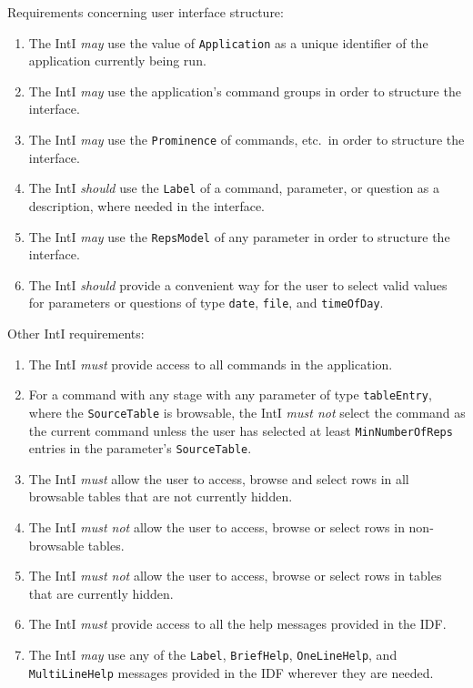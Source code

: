 \documentclass[11pt]{article}
\newcommand{\must}{{\it must}}
\newcommand{\mustnot}{{\it must not}}
\newcommand{\may}{{\it may}}
\newcommand{\should}{{\it should}}
\newcounter{coreReq}
\begin{document}
\noindent Requirements concerning user interface structure:
\begin{enumerate}
\setcounter{enumi}{\value{coreReq}}

\item The IntI {\may} use the value of {\tt Application} as a
  unique identifier of the application currently being run.

\item The IntI {\may} use the application's command groups
  in order to structure the interface.

\item The IntI {\may} use the {\tt Prominence} of commands,
  etc.\ in order to structure the interface.

\item The IntI {\should} use the {\tt Label} of a command, parameter, or
  question as a description, where needed in the interface.

\item The IntI {\may} use the {\tt RepsModel} of any
  parameter in order to structure the interface.

\item The IntI {\should} provide a convenient way for the user
  to select valid values for parameters or questions of type {\tt date},
  {\tt file}, and {\tt timeOfDay}.

\setcounter{coreReq}{\value{enumi}}
\end{enumerate}

\noindent Other IntI requirements:
\begin{enumerate}
\setcounter{enumi}{\value{coreReq}}

\item The IntI {\must} provide access to all commands in the
  application.

\item For a command with any stage with any parameter of type
  {\tt tableEntry}, where the {\tt SourceTable} is browsable,
  the IntI {\mustnot} select the command as the
  current command unless the user has selected at least
  {\tt MinNumberOfReps} entries in the parameter's {\tt SourceTable}.

\item The IntI {\must} allow the user to access, browse and
  select rows in all browsable tables that are not currently hidden.

\item The IntI {\mustnot} allow the user to access, browse
  or select rows in non-browsable tables.

\item The IntI {\mustnot} allow the user to access, browse
  or select rows in tables that are currently hidden.

\item The IntI {\must} provide access to all the help
  messages provided in the IDF.

\item The IntI {\may} use any of the {\tt Label}, {\tt BriefHelp},
  {\tt OneLineHelp}, and {\tt MultiLineHelp} messages provided in the IDF
  wherever they are needed.

\end{enumerate}
\end{document}
